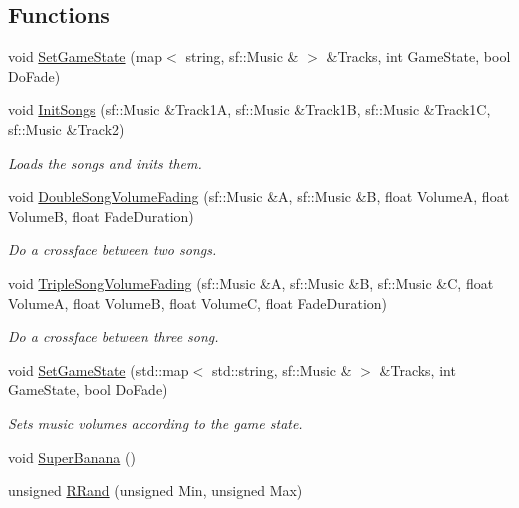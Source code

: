 \subsection*{Functions}
\begin{DoxyCompactItemize}
\item 
void \hyperlink{namespace_chase_game_af423e47c7318b7eeb67ff1f1a6b1547d}{Set\-Game\-State} (map$<$ string, sf\-::\-Music \& $>$ \&Tracks, int Game\-State, bool Do\-Fade)
\item 
void \hyperlink{namespace_chase_game_af1b7d4727ff31281f8efdf46175e94c3}{Init\-Songs} (sf\-::\-Music \&Track1\-A, sf\-::\-Music \&Track1\-B, sf\-::\-Music \&Track1\-C, sf\-::\-Music \&Track2)
\begin{DoxyCompactList}\small\item\em Loads the songs and inits them. \end{DoxyCompactList}\item 
void \hyperlink{namespace_chase_game_a1fafa6862bb2df06c93d286361fefaa4}{Double\-Song\-Volume\-Fading} (sf\-::\-Music \&A, sf\-::\-Music \&B, float Volume\-A, float Volume\-B, float Fade\-Duration)
\begin{DoxyCompactList}\small\item\em Do a crossface between two songs. \end{DoxyCompactList}\item 
void \hyperlink{namespace_chase_game_a3b9e1d486d981f5332d23142eb4777b7}{Triple\-Song\-Volume\-Fading} (sf\-::\-Music \&A, sf\-::\-Music \&B, sf\-::\-Music \&C, float Volume\-A, float Volume\-B, float Volume\-C, float Fade\-Duration)
\begin{DoxyCompactList}\small\item\em Do a crossface between three song. \end{DoxyCompactList}\item 
void \hyperlink{namespace_chase_game_ac628bcb1f9de7ece2d9705ea5c6e9e91}{Set\-Game\-State} (std\-::map$<$ std\-::string, sf\-::\-Music \& $>$ \&Tracks, int Game\-State, bool Do\-Fade)
\begin{DoxyCompactList}\small\item\em Sets music volumes according to the game state. \end{DoxyCompactList}\item 
void \hyperlink{namespace_chase_game_a19b95183bbaf6684ffc6511a4f9922f5}{Super\-Banana} ()
\item 
unsigned \hyperlink{namespace_chase_game_aee2df7cbf4974e167612a7415943f3b0}{R\-Rand} (unsigned Min, unsigned Max)

\end{DoxyCompactItemize}
